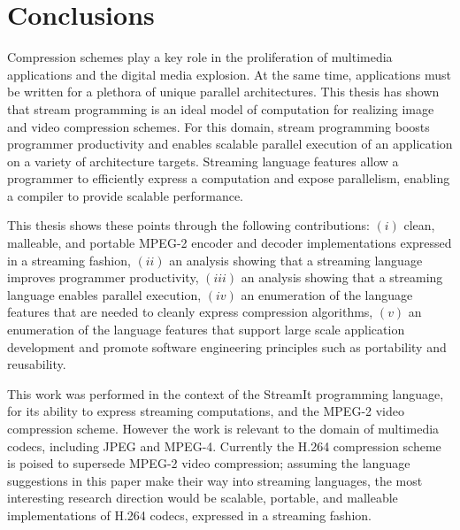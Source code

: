 \chapter{Conclusions}
\label{chapter:conclusions}

Compression schemes play a key role in the proliferation of 
multimedia applications and the digital media explosion. 
At the same time, applications must be written 
for a plethora of unique parallel architectures. 
This thesis has shown that stream programming is an 
ideal model of computation for realizing image and 
video compression schemes. 
For this domain, stream programming boosts programmer 
productivity and enables scalable parallel execution 
of an application on a variety of architecture targets. 
Streaming language features allow a programmer to 
efficiently express a computation and expose 
parallelism, enabling a compiler to provide scalable performance.

This thesis shows these points through the following contributions: 
$(i)$ clean, malleable, and portable MPEG-2 encoder and 
decoder implementations expressed in a streaming fashion, 
$(ii)$ an analysis showing that a streaming language 
improves programmer productivity, 
$(iii)$ an analysis showing that a streaming language 
enables parallel execution, 
$(iv)$ an enumeration of the language features that are 
needed to cleanly express compression algorithms, 
$(v)$ an enumeration of the language features that 
support large scale application development and promote 
software engineering principles such as portability and reusability. 

This work was performed in the context of the StreamIt 
programming language, for its ability to express streaming 
computations, and the MPEG-2 video compression scheme. 
However the work is relevant to the domain of multimedia
codecs, including JPEG and MPEG-4.
Currently the H.264 
compression scheme is poised to supersede MPEG-2 video 
compression; assuming the language suggestions in this 
paper make their way into streaming languages, the most 
interesting research direction would be scalable, portable, 
and malleable implementations of H.264 codecs, expressed in a 
streaming fashion.

